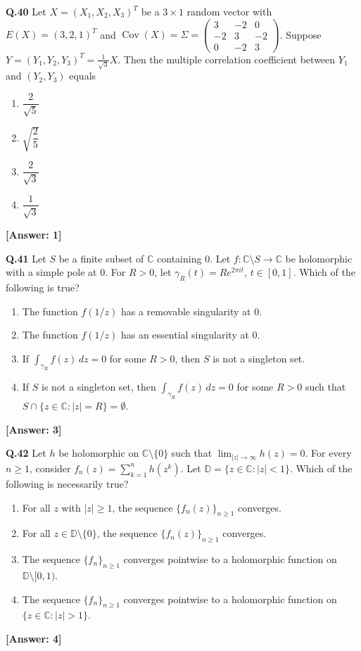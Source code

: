 \documentclass[12pt,a4paper]{article}
\newcommand{\ans}[1]{\quad\textcolor{anscolor}{\textbf{[Answer: #1]}}}
\begin{document}
\textbf{Q.40} Let $X=(X_1,X_2,X_3)^T$ be a $3\times1$ random vector with $E(X)=(3,2,1)^T$ and $\operatorname{Cov}(X)=\Sigma=\begin{pmatrix}3&-2&0\\-2&3&-2\\0&-2&3\end{pmatrix}$. Suppose $Y=(Y_1,Y_2,Y_3)^T=\tfrac{1}{\sqrt{3}}X$. Then the multiple correlation coefficient between $Y_1$ and $(Y_2,Y_3)$ equals
\begin{enumerate}[label=\arabic*.]
\item $\dfrac{2}{\sqrt{5}}$ \item $\sqrt{\dfrac{2}{5}}$ \item $\dfrac{2}{\sqrt{3}}$ \item $\dfrac{1}{\sqrt{3}}$
\end{enumerate}\ans{1}

\textbf{Q.41} Let $S$ be a finite subset of $\mathbb{C}$ containing 0. Let $f:\mathbb{C}\setminus S\to\mathbb{C}$ be holomorphic with a simple pole at 0. For $R>0$, let $\gamma_R(t)=Re^{2\pi it}$, $t\in[0,1]$. Which of the following is true?
\begin{enumerate}[label=\arabic*.]
\item The function $f(1/z)$ has a removable singularity at 0.
\item The function $f(1/z)$ has an essential singularity at 0.
\item If $\int_{\gamma_R}f(z)\,dz=0$ for some $R>0$, then $S$ is not a singleton set.
\item If $S$ is not a singleton set, then $\int_{\gamma_R}f(z)\,dz=0$ for some $R>0$ such that $S\cap\{z\in\mathbb{C}:|z|=R\}=\emptyset$.
\end{enumerate}\ans{3}

\textbf{Q.42} Let $h$ be holomorphic on $\mathbb{C}\setminus\{0\}$ such that $\lim_{|z|\to\infty}h(z)=0$. For every $n\ge1$, consider $f_n(z)=\sum_{k=1}^n h(z^k)$. Let $\mathbb{D}=\{z\in\mathbb{C}:|z|<1\}$. Which of the following is necessarily true?
\begin{enumerate}[label=\arabic*.]
\item For all $z$ with $|z|\ge1$, the sequence $\{f_n(z)\}_{n\ge1}$ converges.
\item For all $z\in\mathbb{D}\setminus\{0\}$, the sequence $\{f_n(z)\}_{n\ge1}$ converges.
\item The sequence $\{f_n\}_{n\ge1}$ converges pointwise to a holomorphic function on $\mathbb{D}\setminus[0,1)$.
\item The sequence $\{f_n\}_{n\ge1}$ converges pointwise to a holomorphic function on $\{z\in\mathbb{C}:|z|>1\}$.
\end{enumerate}\ans{4}
\end{document}
